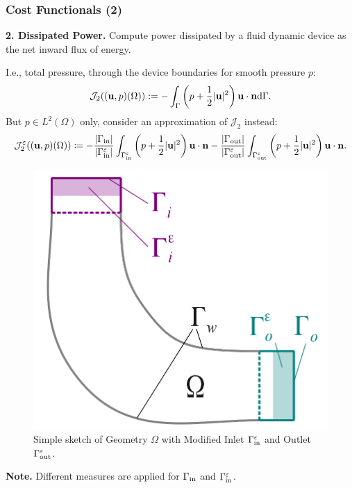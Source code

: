 \documentclass[10pt,xcolor=table,english]{beamer}   %
\begin{document}
\begin{frame}
    \frametitle{Cost Functionals (2)}
    \textbf{2. Dissipated Power.} Compute power dissipated by a fluid dynamic device as the net inward flux of energy.
    
    I.e., total pressure, through the device boundaries for smooth pressure $p$:
    \begin{align*}
    \mathcal{J}_2(({\bf u},p)(\Omega)) := -\int_\Gamma \left(p + \frac{1}{2}|{\bf u}|^2\right){\bf u}\cdot{\bf n}{\rm d}\Gamma. 
    \end{align*}
    But $p\in L^2(\Omega)$ only, consider an approximation of $\mathcal{J}_2$ instead:
    \begin{align*}
    \mathcal{J}_2^\varepsilon(({\bf u},p)(\Omega))\coloneqq -\frac{|\Gamma_{\rm in}|}{|\Gamma_{\rm in}^\varepsilon|} \int_{\Gamma_{\rm in}^\varepsilon}\left(p + \frac{1}{2}|{\bf u}|^2\right){\bf u}\cdot {\bf n} - \frac{|\Gamma_{\rm out}|}{|\Gamma_{\rm out}^\varepsilon|}\int_{\Gamma_{\rm out}^\varepsilon} \left(p + \frac{1}{2}|{\bf u}|^2\right){\bf u}\cdot {\bf n}.
    \end{align*}
    \begin{figure}
        \centering
        \includegraphics[scale=0.6]{Geometry_Inlet_Outlet_epsilon}
        \caption{Simple sketch of Geometry $\Omega$ with Modified Inlet $\Gamma_{\rm in}^\varepsilon$ and Outlet $\Gamma_{\rm out}^\varepsilon$.}
    \end{figure}
    \textbf{Note.} Different measures are applied for $\Gamma_{\rm in}$ and $\Gamma_{\rm in}^\varepsilon$.
\end{frame}
\end{document}
